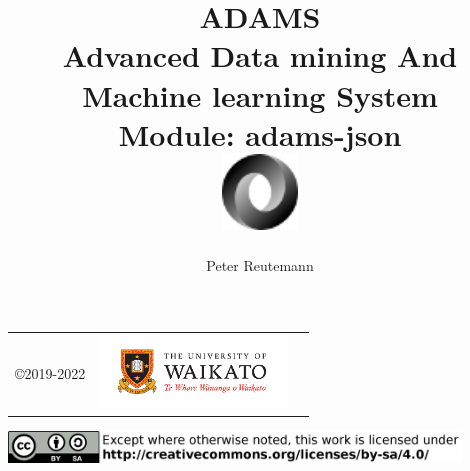 \documentclass[a4paper]{book}
\title{
  \textbf{ADAMS} \\
  {\Large \textbf{A}dvanced \textbf{D}ata mining \textbf{A}nd \textbf{M}achine
  learning \textbf{S}ystem} \\
  {\Large Module: adams-json} \\
  \vspace{1cm}
  \includegraphics[width=2cm]{images/json-module.png} \\
}
\author{
  Peter Reutemann
}
\begin{document}
\begin{titlepage}
\maketitle

\thispagestyle{empty}
\center
\begin{table}[b]
	\begin{tabular}{c l l}
		\parbox[c][2cm]{2cm}{\copyright 2019-2022} &
		\parbox[c][2cm]{5cm}{\includegraphics[width=5cm]{images/coat_of_arms.pdf}} \\
	\end{tabular}
	\includegraphics[width=12cm]{images/cc.png} \\
\end{table}

\end{titlepage}

\tableofcontents

\end{document}
